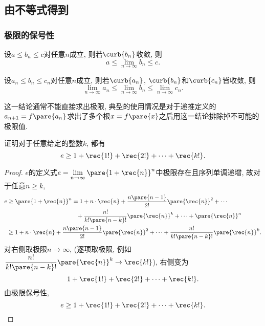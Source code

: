\documentclass{ctexart}
\begin{document}


\subsection{由不等式得到} %
\label{sub:由不等式得到}

\subsubsection{极限的保号性} %
\label{ssub:极限的保号性}

\begin{theorem}[极限对常数的保号性]
    \label{thm:极限对常数的保号性}
    设$a \le b_n \le c$对任意$n$成立, 则若$\curb{b_n}$收敛, 则
    \[ a \le \lim_{n\rightarrow \infty} b_n \le c. \]
\end{theorem}
\begin{theorem}[极限对数列的保号性]
    设$a_n \le b_n \le c_n$对任意$n$成立, 则若$\curb{a_n}$, $\curb{b_n}$和$\curb{c_n}$皆收敛, 则
    \[ \lim_{n\rightarrow \infty} a_n \le \lim_{n\rightarrow \infty} b_n \le \lim_{n\rightarrow \infty} c_n. \]
\end{theorem}
这一结论通常不能直接求出极限, 典型的使用情况是对于递推定义的$a_{n+1}=f\pare{a_n}$求出了多个根$x=f\pare{x}$之后用这一结论排除掉不可能的极限值.
\begin{sample}
    \begin{ex}
        证明对于任意给定的整数$k$, 都有
        \[ e \ge 1 + \rec{1!} + \rec{2!} + \cdots + \rec{k!}. \]
    \end{ex}
    \begin{proof}
        $e$的定义式$\displaystyle e = \lim_{n\rightarrow\infty} \pare{1+\rec{n}}^n$中极限存在且序列单调递增, 故对于任意$n\ge k$,
        \begin{align*}
            e &\ge \pare{1+\rec{n}}^n = 1 + n\cdot\rec{n} + \frac{n\pare{n-1}}{2!}\pare{\rec{n}}^2 + \cdots\\
            & \phantom{\ge \pare{1+\rec{n}}^n \ge} + \frac{n!}{k!\pare{n-k}!}\pare{\rec{n}}^k + \cdots + \pare{\rec{n}}^n \\
            & \ge 1 + n\cdot\rec{n} + \frac{n\pare{n-1}}{2!}\pare{\rec{n}}^2 + \cdots + \frac{n!}{k!\pare{n-k}!}\pare{\rec{n}}^k.
        \end{align*}
        对右侧取极限$n\rightarrow\infty$, (逐项取极限, 例如$\displaystyle \frac{n!}{k!\pare{n-k}!}\pare{\rec{n}}^k \rightarrow \rec{k!}$), 右侧变为
        \[ 1 + \rec{1!} + \rec{2!} + \cdots + \rec{k!}. \]
        由极限保号性,
        \[ e \ge 1 + \rec{1!} + \rec{2!} + \cdots + \rec{k!}. \qedhere \]
    \end{proof}
\end{sample}
\end{document}
